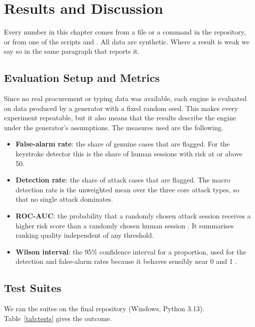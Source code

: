 \chapter{Results and Discussion}
\label{ch:results}

Every number in this chapter comes from a file or a command in the repository, or from one of the scripts {\small{}} and {\small{}}. All data are synthetic. Where a result is weak we say so in the same paragraph that reports it.

\section{Evaluation Setup and Metrics}
Since no real procurement or typing data was available, each engine is evaluated on data produced by a generator with a fixed random seed. This makes every experiment repeatable, but it also means that the results describe the engine under the generator's assumptions. The measures used are the following.

\begin{itemize}
    \item \textbf{False-alarm rate}: the share of genuine cases that are flagged. For the keystroke detector this is the share of human sessions with risk at or above 50.
    \item \textbf{Detection rate}: the share of attack cases that are flagged. The macro detection rate is the unweighted mean over the three core attack types, so that no single attack dominates.
    \item \textbf{ROC-AUC}: the probability that a randomly chosen attack session receives a higher risk score than a randomly chosen human session \cite{fawcett2006roc}. It summarises ranking quality independent of any threshold.
    \item \textbf{Wilson interval}: the 95\% confidence interval for a proportion, used for the detection and false-alarm rates because it behaves sensibly near 0 and 1 \cite{wilson1927probable}.
\end{itemize}

\section{Test Suites}
We ran the suites on the final repository (Windows, Python 3.13). Table~\ref{tab:tests} gives the outcome.

